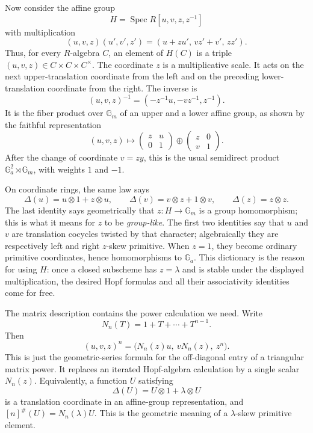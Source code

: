 \documentclass[11pt]{amsart}
\theoremstyle{remark}
\newcommand{\Ga}{\mathbb G_a}
\newcommand{\Gm}{\mathbb G_m}
\newcommand{\Spec}{\operatorname{Spec}}
\newcommand{\ot}{\otimes}
\begin{document}
Now consider the affine group
\begin{equation}\label{eq:H}
 H=\Spec R[u,v,z,z^{-1}]
\end{equation}
with multiplication
\begin{equation}\label{eq:H-law}
 (u,v,z)(u',v',z')
   =(u+zu',\,vz'+v',\,zz').
\end{equation}
Thus, for every \(R\)-algebra \(C\), an element of \(H(C)\) is a triple
\((u,v,z)\in C\times C\times C^\times\).  The coordinate \(z\) is a
multiplicative scale.  It acts on the next upper-translation coordinate
from the left and on the preceding lower-translation coordinate from
the right.  The inverse is
\[
 (u,v,z)^{-1}=(-z^{-1}u,-vz^{-1},z^{-1}).
\]
It is the fiber product over \(\Gm\) of an upper and a lower affine
group, as shown by the faithful representation
\begin{equation}\label{eq:H-matrix}
 (u,v,z)\longmapsto
 \begin{pmatrix}z&u\\0&1\end{pmatrix}
 \oplus
 \begin{pmatrix}z&0\\v&1\end{pmatrix}.
\end{equation}
After the change of coordinate \(v=zy\), this is the usual semidirect
product \(\Ga^2\rtimes\Gm\), with weights \(1\) and \(-1\).

On coordinate rings, the same law says
\[
 \Delta(u)=u\ot1+z\ot u,\qquad
 \Delta(v)=v\ot z+1\ot v,\qquad
 \Delta(z)=z\ot z.
\]
The last identity says geometrically that \(z:H\to\Gm\) is a group
homomorphism; this is what it means for \(z\) to be \emph{group-like}.
The first two identities say that \(u\) and \(v\) are translation
cocycles twisted by that character; algebraically they are respectively
left and right \(z\)-skew primitive.  When \(z=1\), they become ordinary
primitive coordinates, hence homomorphisms to \(\Ga\).  This dictionary
is the reason for using \(H\): once a closed subscheme has \(z=\lambda\)
and is stable under the displayed multiplication, the desired Hopf
formulas and all their associativity identities come for free.

The matrix description contains the power calculation we need.  Write
\[
 N_n(T)=1+T+\cdots+T^{n-1}.
\]
Then
\begin{equation}\label{eq:H-power}
 (u,v,z)^n=\bigl(N_n(z)u,\ vN_n(z),\ z^n\bigr).
\end{equation}
This is just the geometric-series formula for the off-diagonal entry of
a triangular matrix power.  It replaces an iterated Hopf-algebra
calculation by a single scalar \(N_n(z)\).
Equivalently, a function \(U\) satisfying
\[
 \Delta(U)=U\ot1+\lambda\ot U
\]
is a translation coordinate in an affine-group representation, and
\([n]^\#(U)=N_n(\lambda)U\).  This is the geometric meaning of a
\(\lambda\)-skew primitive element.
\end{document}
